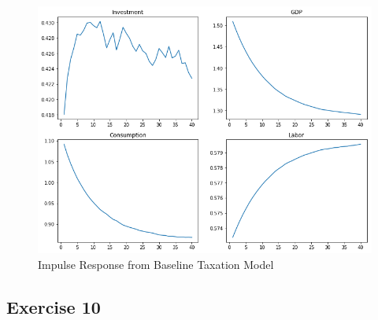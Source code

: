 \documentclass{article}
\begin{document}
    \begin{figure}[!h]
    	\centering
    	\caption{Impulse Response from Baseline Taxation Model}
    	\includegraphics[scale = 0.5]{fig6}
    \end{figure}
    
    \subsection*{Exercise 10}
\end{document}
